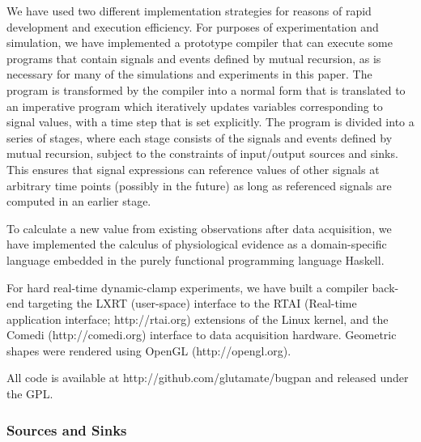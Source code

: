We have used two different implementation strategies for reasons of
rapid development and execution efficiency. For purposes of
experimentation and simulation, we have implemented a prototype
compiler that can execute some programs that contain signals and
events defined by mutual recursion, as is necessary for many of the
simulations and experiments in this paper. The program is transformed
by the compiler into a normal form that is translated to an imperative
program which iteratively updates variables corresponding to signal
values, with a time step that is set explicitly. The program is
divided into a series of stages, where each stage consists of the
signals and events defined by mutual recursion, subject to the
constraints of input/output sources and sinks. This ensures that
signal expressions can reference values of other signals at arbitrary
time points (possibly in the future) as long as referenced signals are
computed in an earlier stage.

To calculate a new value from existing observations after data
acquisition, we have implemented the calculus of physiological
evidence as a domain-specific language embedded in the purely functional
programming language Haskell. 

For hard real-time dynamic-clamp experiments, we have built a compiler
back-end targeting the LXRT (user-space) interface to the RTAI (Real-time
application interface; http://rtai.org) extensions of the Linux
kernel, and the Comedi (http://comedi.org) interface to data
acquisition hardware. Geometric shapes were rendered using OpenGL
(http://opengl.org).

All code is available at http://github.com/glutamate/bugpan and
released under the GPL.

\subsubsection*{Sources and Sinks}

